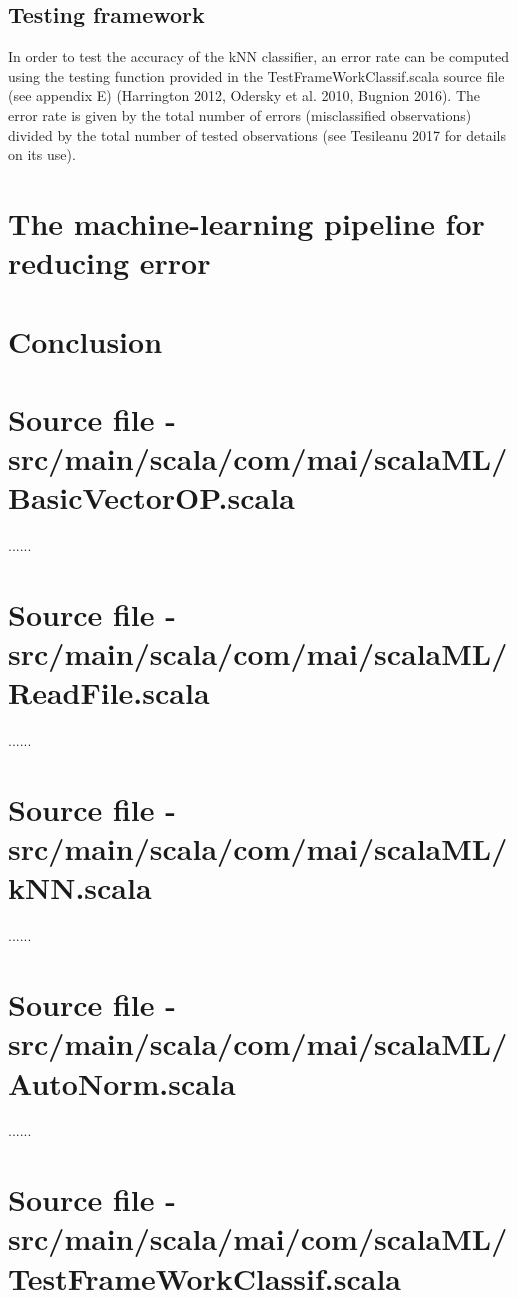 \documentclass[journal]{IEEEtran}
\begin{document}
\subsection{Testing framework}    

In order to test the accuracy of the kNN classifier, an error rate can be computed using the testing function provided in the TestFrameWorkClassif.scala source file (see appendix E) (Harrington 2012, Odersky et al. 2010, Bugnion 2016).
 The error rate is given by the total number of errors (misclassified observations) divided by the total number of tested observations (see Tesileanu 2017 for details on its use). 

\section{The machine-learning pipeline for reducing error}




\section{Conclusion}



\appendices
\section{Source file - src/main/scala/com/mai/scalaML/BasicVectorOP.scala}

......

\section{Source file - src/main/scala/com/mai/scalaML/ReadFile.scala}

......

\section{Source file - src/main/scala/com/mai/scalaML/kNN.scala}

......

\section{Source file - src/main/scala/com/mai/scalaML/AutoNorm.scala}

......

\section{Source file - src/main/scala/mai/com/scalaML/TestFrameWorkClassif.scala}
\end{document}
